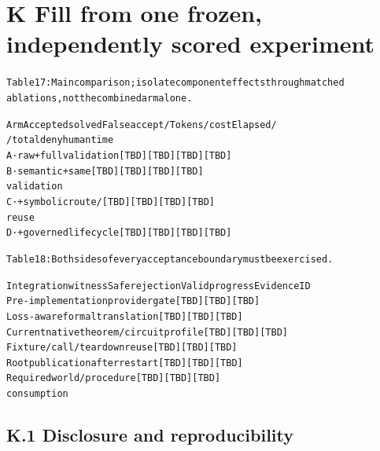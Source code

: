 \section*{K Fill from one frozen, independently scored experiment}

\begingroup\fontsize{7}{8.4}\selectfont
\begin{alltt}
Table 17: Main comparison; isolate component effects through matched
ablations, not the combined arm alone.
\end{alltt}\endgroup

\begingroup\fontsize{7}{8.4}\selectfont
\begin{alltt}
Arm                         Accepted solved      False accept /    Tokens / cost     Elapsed /
                            / total              deny                                human time
A · raw + full validation   [TBD]                [TBD]             [TBD]             [TBD]
B · semantic + same         [TBD]                [TBD]             [TBD]             [TBD]
validation
C · + symbolic route /      [TBD]                [TBD]             [TBD]             [TBD]
reuse
D · + governed lifecycle    [TBD]                [TBD]             [TBD]             [TBD]
\end{alltt}\endgroup




\begingroup\fontsize{7}{8.4}\selectfont
\begin{alltt}
Table 18: Both sides of every acceptance boundary must be exercised.
\end{alltt}\endgroup

\begingroup\fontsize{7}{8.4}\selectfont
\begin{alltt}
Integration witness                       Safe rejection       Valid progress        Evidence ID
Pre-implementation provider gate          [TBD]                [TBD]                 [TBD]
Loss-aware formal translation             [TBD]                [TBD]                 [TBD]
Current native theorem/circuit profile    [TBD]                [TBD]                 [TBD]
Fixture/call/teardown reuse               [TBD]                [TBD]                 [TBD]
Root publication after restart            [TBD]                [TBD]                 [TBD]
Required world/procedure                  [TBD]                [TBD]                 [TBD]
consumption
\end{alltt}\endgroup


\subsection*{K.1 Disclosure and reproducibility}

